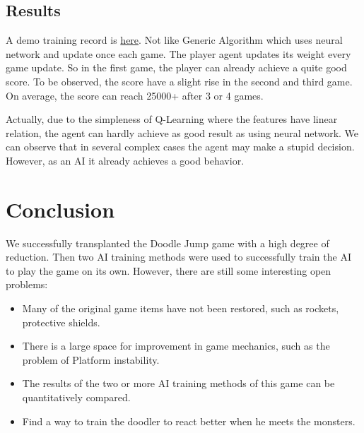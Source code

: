 \documentclass[final]{cvpr}
\begin{document}
\subsection{Results}
A demo training record is \href{qlearning.mp4}{here}.
Not like Generic Algorithm which uses neural network and update once each game.
The player agent updates its weight every game update.
So in the first game, the player can already achieve a quite good score.
To be observed, the score have a slight rise in the second and third game.
On average, the score can reach 25000+ after 3 or 4 games.

Actually, due to the simpleness of Q-Learning where the features have linear relation, 
the agent can hardly achieve as good result as using neural network.
We can observe that in several complex cases the agent may make a stupid decision.
However, as an AI it already achieves a good behavior.


\section{Conclusion}
We successfully transplanted the Doodle Jump game with a high degree of reduction. Then two AI training methods were used to successfully train the AI to play the game on its own. However, there are still some interesting open problems:
\begin{itemize}
    \item Many of the original game items have not been restored, such as rockets, protective shields.
    \item There is a large space for improvement in game mechanics, such as the problem of Platform instability.
    \item The results of the two or more AI training methods of this game can be quantitatively compared.
    \item Find a way to train the doodler to react better when he meets the monsters.
\end{itemize}
\end{document}
